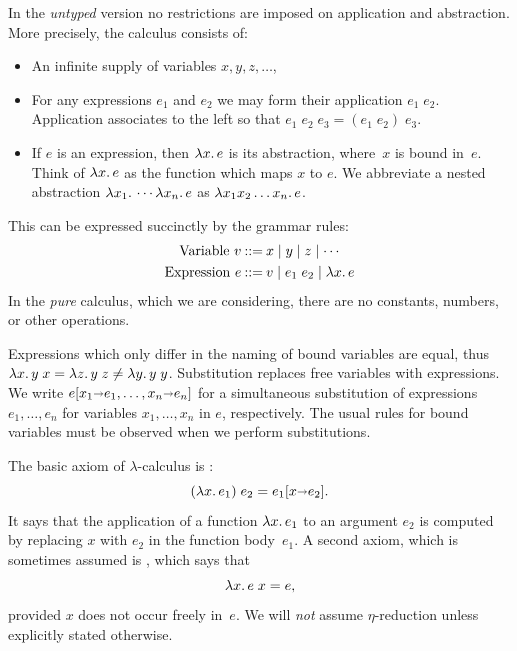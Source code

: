 In the \emph{untyped} version no restrictions are imposed on
application and abstraction. More precisely, the calculus consists of:
%
\begin{itemize}
\item An infinite supply of variables $x, y, z, \ldots$,
\item For any expressions $e_1$ and $e_2$ we may form their
  application $e_1\; e_2$. Application associates to the left so that
  $e_1\; e_2\; e_3 = (e_1\; e_2)\; e_3$.
\item If $e$ is an expression, then $\lambda x .\,e$ is its abstraction,
  where~$x$ is bound in~$e$. Think of $\lambda x .\,e$ as the function
  which maps $x$ to $e$. We abbreviate a nested abstraction
  $\lambda x_1 .\,\cdots \lambda x_n .\,e$ as $\lambda x_1 x_2 \ldots x_n .\,e$.
\end{itemize}
%
This can be expressed succinctly by the grammar rules:
%
\begin{align*}
  \text{Variable}\ v &\mathbin{{:}{:}{=}} x \mid y \mid z \mid \cdots \\
  \text{Expression}\ e &\mathbin{{:}{:}{=}} v \mid e_1\;e_2 \mid \lambda x .\,e
\end{align*}
%
In the \emph{pure} calculus, which we are considering, there are no
constants, numbers, or other operations.

Expressions which only differ in the naming of bound variables are
equal, thus $\lambda x .\,y\; x = \lambda z .\,y\; z \neq \lambda y .\,y\;
  y$. Substitution replaces free variables with expressions. We write
$e[x_1 {\shortrightarrow} e_1, \ldots, x_n {\shortrightarrow} e_n]$ for a
simultaneous substitution of expressions $e_1, \ldots, e_n$ for
variables $x_1, \ldots, x_n$ in $e$, respectively. The usual rules for
bound variables must be observed when we perform
substitutions.

The basic axiom of $\lambda$-calculus is :
%
\begin{equation*}
  (\lambda x .\,e_1)\; e_2 = e_1[x {\shortrightarrow} e_2].
\end{equation*}
%
It says that the application of a function $\lambda x .\,e_1$ to an
argument $e_2$ is computed by replacing $x$ with $e_2$ in the function
body~$e_1$. A second axiom, which is sometimes assumed is
, which says that
%
\begin{equation*}
  \lambda x .\,e\; x = e,
\end{equation*}
%
provided $x$ does not occur freely in~$e$. We will \emph{not} assume
$\eta$-reduction unless explicitly stated otherwise.

